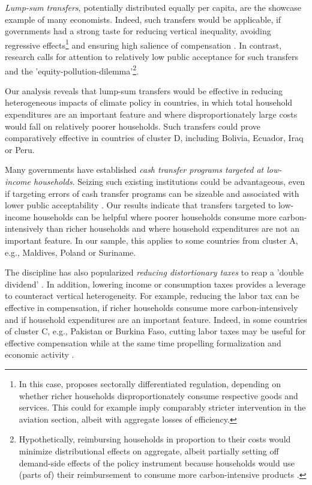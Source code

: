 \documentclass[12pt, a4paper]{article}
\begin{document}
\textit{Lump-sum transfers}, potentially distributed equally per capita, are the showcase example of many economists. Indeed, such transfers would be applicable, if governments had a strong taste for reducing vertical inequality, avoiding regressive effects\footnote{In this case, \textcite{Stiglitz.2019} proposes sectorally differentiated regulation, depending on whether richer households disproportionately consume respective goods and services. This could for example imply comparably stricter intervention in the aviation section, albeit with aggregate losses of efficiency.} and ensuring high salience of compensation \autocite{Chetty.2009}. In contrast, research calls for attention to relatively low public acceptance for such transfers and the 'equity-pollution-dilemma'\footnote{Hypothetically, reimbursing households in proportion to their costs would minimize distributional effects on aggregate, albeit partially setting off demand-side effects of the policy instrument because households would use (parts of) their reimbursement to consume more carbon-intensive products \autocite[see also][]{Stiglitz.2019}.}\autocite{Sager.2019}.

Our analysis reveals that lump-sum transfers would be effective in reducing heterogeneous impacts of climate policy in countries, in which total household expenditures are an important feature and where disproportionately large costs would fall on relatively poorer households. Such transfers could prove comparatively effective in countries of cluster D, including Bolivia, Ecuador, Iraq or Peru. %

Many governments have established \textit{cash transfer programs targeted at low-income households}. Seizing such existing institutions could be advantageous, even if targeting errors of cash transfer programs can be sizeable \autocite{Banerjee.2022} and associated with lower public acceptability \autocite{Bah.2019}. Our results indicate that transfers targeted to low-income households can be helpful where poorer households consume more carbon-intensively than richer households and where household expenditures are not an important feature. In our sample, this applies to some countries from cluster A, e.g., Maldives, Poland or Suriname.

The discipline has also popularized \textit{reducing distortionary taxes} to reap a 'double dividend' \autocite{Bovenberg.1996}. In addition, lowering income or consumption taxes provides a leverage to counteract vertical heterogeneity. For example, reducing the labor tax can be effective in compensation, if richer households consume more carbon-intensively and if household expenditures are an important feature. Indeed, in some countries of cluster C, e.g., Pakistan or Burkina Faso, cutting labor taxes may be useful for effective compensation while at the same time propelling formalization \autocite{Jessen.2021,Rocha.2018} and economic activity \autocite{Ulyssea.2018}.
\end{document}
